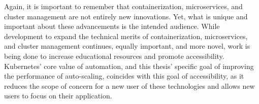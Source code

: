 Again, it is important to remember that containerization, microservices, and
cluster management are not entirely new innovations. Yet, what is unique and
important about these advancements is the intended audience. While development to expand
the technical merits of containerization, microservices, and cluster management
continues, equally important, and more novel, work is being done to increase
educational resources and promote accessibility. Kubernetes' core value of
automation, and this thesis' specific goal of improving the performance of
auto-scaling, coincides with this goal of accessibility, as it reduces the scope
of concern for a new user of these technologies and allows new users to focus on
their application.
